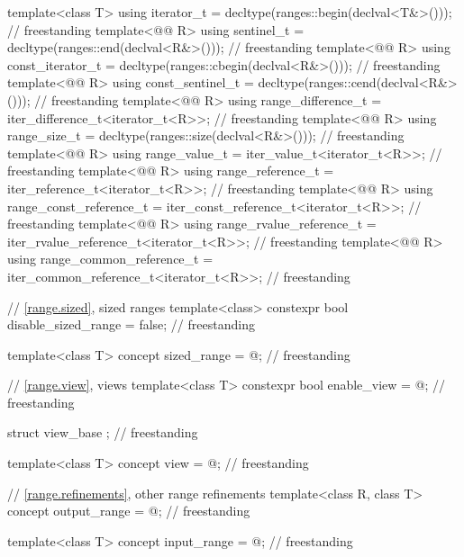 \begin{codeblock}
{  template<class T>
    using iterator_t = decltype(ranges::begin(declval<T&>()));                      // freestanding
  template<@@ R>
    using sentinel_t = decltype(ranges::end(declval<R&>()));                        // freestanding
  template<@@ R>
    using const_iterator_t = decltype(ranges::cbegin(declval<R&>()));               // freestanding
  template<@@ R>
    using const_sentinel_t = decltype(ranges::cend(declval<R&>()));                 // freestanding
  template<@@ R>
    using range_difference_t = iter_difference_t<iterator_t<R>>;                    // freestanding
  template<@@ R>
    using range_size_t = decltype(ranges::size(declval<R&>()));                     // freestanding
  template<@@ R>
    using range_value_t = iter_value_t<iterator_t<R>>;                              // freestanding
  template<@@ R>
    using range_reference_t = iter_reference_t<iterator_t<R>>;                      // freestanding
  template<@@ R>
    using range_const_reference_t = iter_const_reference_t<iterator_t<R>>;          // freestanding
  template<@@ R>
    using range_rvalue_reference_t = iter_rvalue_reference_t<iterator_t<R>>;        // freestanding
  template<@@ R>
    using range_common_reference_t = iter_common_reference_t<iterator_t<R>>;        // freestanding

  // \ref{range.sized}, sized ranges
  template<class>
    constexpr bool disable_sized_range = false;                                     // freestanding

  template<class T>
    concept sized_range = @\seebelow@;                                                // freestanding

  // \ref{range.view}, views
  template<class T>
    constexpr bool enable_view = @\seebelow@;                                         // freestanding

  struct view_base {};                                                              // freestanding

  template<class T>
    concept view = @\seebelow@;                                                       // freestanding

  // \ref{range.refinements}, other range refinements
  template<class R, class T>
    concept output_range = @\seebelow@;                                               // freestanding

  template<class T>
    concept input_range = @\seebelow@;                                                // freestanding

}
\end{codeblock}
